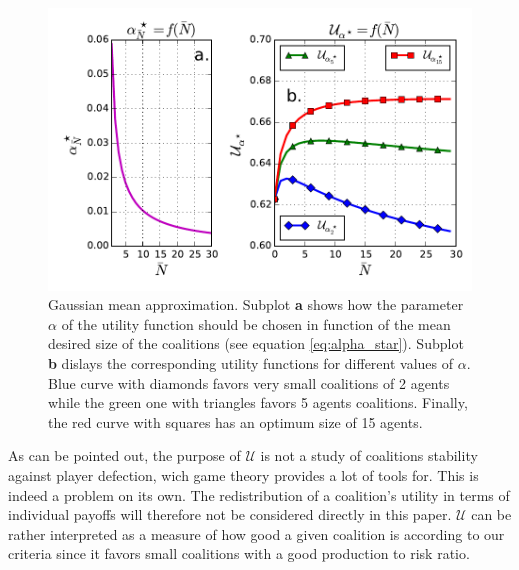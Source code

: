 \documentclass[conference]{IEEEtran}
\begin{document}
\begin{figure}
\includegraphics[scale=.6]{mean_field.pdf}
\caption{Gaussian mean approximation. Subplot \textbf{a} shows how the parameter $ \alpha $ of the utility function should be chosen in function of the mean desired size of the coalitions (see equation \ref{eq:alpha_star}). Subplot \textbf{b} dislays the corresponding utility functions for different values of $ \alpha $. Blue curve with diamonds favors very small coalitions of 2 agents while the green one with triangles favors 5 agents coalitions. Finally, the red curve with squares has an optimum size of 15 agents. }
\label{fig:mean_approx}
\end{figure}


As can be pointed out, the purpose of $ \mathcal{U} $ is not a study of coalitions stability against player defection, wich game theory provides a lot of tools for. This is indeed a problem on its own. The redistribution of a coalition's utility in terms of individual payoffs will therefore not be considered directly in this paper. $ \mathcal{U} $ can be rather interpreted as a measure of how good a given coalition is according to our criteria since it favors small coalitions with a good production to risk ratio.
\end{document}
